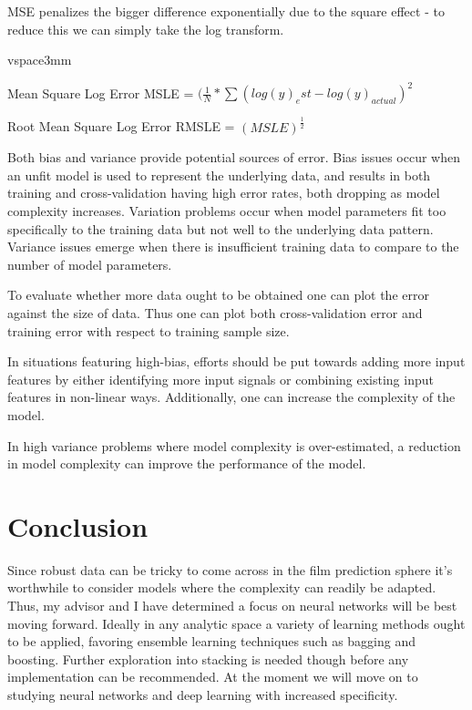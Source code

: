 \documentclass{article}
\begin{document}
\begin{spacing}{1.1}
MSE penalizes the bigger difference exponentially due to the square effect - to reduce this we can simply take the log transform.  

vspace{3mm}

Mean Square Log Error MSLE = $(\frac{1}{N}*\sum(log(y)_est-log(y)_{actual})^2$

Root Mean Square Log Error RMSLE = $(MSLE)^{\frac{1}{2}}$

\vspace{3mm}

Both bias and variance provide potential sources of error.  Bias issues occur when an unfit model is used to represent the underlying data, and results in both training and cross-validation having high error rates, both dropping as model complexity increases.  Variation problems occur when model parameters fit too specifically to the training data but not well to the underlying data pattern.  Variance issues emerge when there is insufficient training data to compare to the number of model parameters.  

\vspace{3mm}

To evaluate whether more data ought to be obtained one can plot the error against the size of data.  Thus one can plot both cross-validation error and training error with respect to training sample size.  

\vspace{3mm}

In situations featuring high-bias, efforts should be put towards adding more input features by either identifying more input signals or combining existing input features in non-linear ways.  Additionally, one can increase the complexity of the model.  

\vspace{3mm}

In high variance problems where model complexity is over-estimated, a reduction in model complexity can improve the performance of the model.  

\section{Conclusion}

Since robust data can be tricky to come across in the film prediction sphere it's worthwhile to consider models where the complexity can readily be adapted.  Thus, my advisor and I have determined a focus on neural networks will be best moving forward.  Ideally in any analytic space a variety of learning methods ought to be applied, favoring ensemble learning techniques such as bagging and boosting.  Further exploration into stacking is needed though before any implementation can be recommended.  At the moment we will move on to studying neural networks and deep learning with increased specificity.  


\end{spacing}
\end{document}
